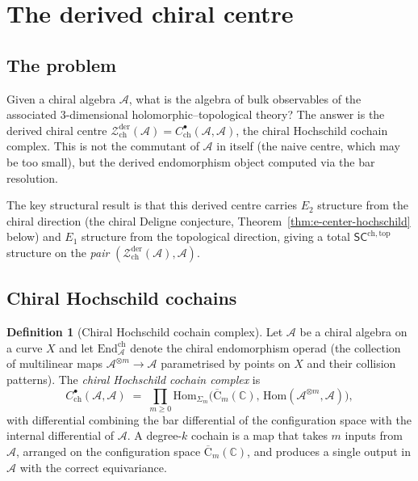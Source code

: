 \documentclass[11pt,reqno]{amsart}
\theoremstyle{definition}
\newtheorem{definition}[theorem]{Definition}
\theoremstyle{remark}
\providecommand{\cA}{\mathcal{A}}
\providecommand{\cZ}{\mathcal{Z}}
\providecommand{\FM}{\overline{\mathrm{C}}}
\providecommand{\Eone}{E_1}
\providecommand{\Etwo}{E_2}
\providecommand{\SCchtop}{\ensuremath{\mathsf{SC}^{\mathrm{ch,top}}}}
\providecommand{\bC}{\mathbb{C}}
\providecommand{\Hom}{\mathrm{Hom}}
\providecommand{\End}{\mathrm{End}}
\begin{document}

\section{The derived chiral centre}
\label{sec:derived-centre}

\subsection{The problem}

Given a chiral algebra $\cA$, what is the algebra of bulk
observables of the associated $3$-dimensional
holomorphic--topological theory? The answer is the derived
chiral centre
$\cZ^{\mathrm{der}}_{\mathrm{ch}}(\cA) =
C^\bullet_{\mathrm{ch}}(\cA, \cA)$, the chiral Hochschild
cochain complex. This is not the commutant of $\cA$ in itself
(the naive centre, which may be too small), but the derived
endomorphism object computed via the bar resolution.

The key structural result is that this derived centre carries
$\Etwo$ structure from the chiral direction (the chiral Deligne
conjecture, Theorem~\ref{thm:e-center-hochschild} below) and
$\Eone$ structure from the topological direction, giving a
total $\SCchtop$ structure on the \emph{pair}
$(\cZ^{\mathrm{der}}_{\mathrm{ch}}(\cA), \cA)$.

\subsection{Chiral Hochschild cochains}

\begin{definition}[Chiral Hochschild cochain complex]
\label{def:e-chirHoch}
Let $\cA$ be a chiral algebra on a curve $X$ and let
$\End^{\mathrm{ch}}_\cA$ denote the chiral endomorphism
operad (the collection of multilinear maps
$\cA^{\otimes m} \to \cA$ parametrised by points on $X$ and
their collision patterns). The \emph{chiral Hochschild cochain
complex} is
\begin{equation}\label{eq:e-chirHoch}
C^\bullet_{\mathrm{ch}}(\cA, \cA)
\;=\;
\prod_{m \ge 0}
\Hom_{\Sigma_m}\!\bigl(
\FM_m(\bC),\,
\Hom(\cA^{\otimes m}, \cA)
\bigr),
\end{equation}
with differential combining the bar differential of the
configuration space with the internal differential of $\cA$.
A degree-$k$ cochain is a map that takes $m$ inputs from
$\cA$, arranged on the configuration space $\FM_m(\bC)$, and
produces a single output in $\cA$ with the correct
equivariance.
\end{definition}
\end{document}
